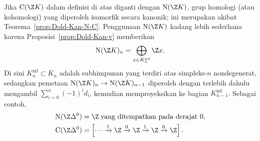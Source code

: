 Jika $\mathrm{C}(\Z K)$ dalam definisi di atas diganti dengan
$\mathrm{N}(\Z K)$, grup homologi (atau kohomologi) yang diperoleh isomorfik
secara kanonik; ini merupakan akibat Teorema~\ref{prop:Dold-Kan-N-C}.
Penggunaan $\mathrm{N}(\Z K)$ kadang lebih sederhana karena
Proposisi~\ref{prop:Dold-Kan-v} memberikan
\[
\mathrm{N}(\Z K)_n=\bigoplus_{x\in K_n^{\mathrm{nd}}}\Z x.
\]
Di sini $K_n^{\mathrm{nd}}\subset K_n$ adalah subhimpunan yang terdiri atas
simpleks-$n$ nondegenerat, sedangkan pemetaan
$\mathrm{N}(\Z K)_n\to\mathrm{N}(\Z K)_{n-1}$ diperoleh dengan terlebih
dahulu mengambil $\sum_{i=0}^n(-1)^id_i$, kemudian memproyeksikan ke bagian
$K_{n-1}^{\mathrm{nd}}$. Sebagai contoh,
\begin{align*}
	\mathrm{N}(\Z\Delta^0)&=\Z\;\text{yang ditempatkan pada derajat $0$},\\
	\mathrm{C}(\Z\Delta^0)&=
	\left[\cdots\xrightarrow{1}\Z\xrightarrow{0}\Z
	\xrightarrow{1}\Z\xrightarrow{0}\Z\right].
\end{align*}

